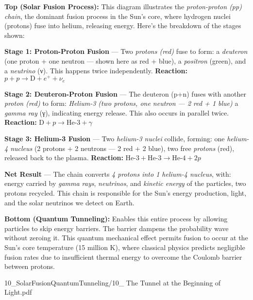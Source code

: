 \begin{SideNotePage}{
  \textbf{Top (Solar Fusion Process):} This diagram illustrates the \emph{proton-proton (pp) chain}, the dominant fusion process in the Sun's core, where hydrogen nuclei (protons) fuse into helium, releasing energy. Here's the breakdown of the stages shown: \par
  \textbf{Stage 1: Proton-Proton Fusion} — Two \emph{protons (red)} fuse to form: a \emph{deuteron} (one proton + one neutron — shown here as red + blue), a \emph{positron} (green), and a \emph{neutrino} ({\greekfont ν}). This happens twice independently. \textbf{Reaction:} $p + p \rightarrow \text{D} + e^+ + \nu_e$ \par
  \textbf{Stage 2: Deuteron-Proton Fusion} — The deuteron (p+n) fuses with another \emph{proton (red)} to form: \emph{Helium-3 (two protons, one neutron — 2 red + 1 blue)} a \emph{gamma ray} ({\greekfont γ}), indicating energy release. This also occurs in parallel twice. \textbf{Reaction:} $\text{D} + p \rightarrow \text{He-3} + \gamma$ \par
  \textbf{Stage 3: Helium-3 Fusion} — Two \emph{helium-3 nuclei} collide, forming: one \emph{helium-4 nucleus} (2 protons + 2 neutrons — 2 red + 2 blue), two free \emph{protons} (red), released back to the plasma. \textbf{Reaction:} $\text{He-3} + \text{He-3} \rightarrow \text{He-4} + 2p$ \par
  \textbf{Net Result} — The chain converts \emph{4 protons into 1 helium-4 nucleus}, with: energy carried by \emph{gamma rays}, \emph{neutrinos}, and \emph{kinetic energy} of the particles, two protons recycled. This chain is responsible for the Sun's energy production, light, and the solar neutrinos we detect on Earth. \par
  \textbf{Bottom (Quantum Tunneling):} Enables this entire process by allowing particles to skip energy barriers. The barrier dampens the probability wave without zeroing it. This quantum mechanical effect permits fusion to occur at the Sun's core temperature (15 million K), where classical physics predicts negligible fusion rates due to insufficient thermal energy to overcome the Coulomb barrier between protons.
}{10_SolarFusionQuantumTunneling/10_ The Tunnel at the Beginning of Light.pdf}
\end{SideNotePage}